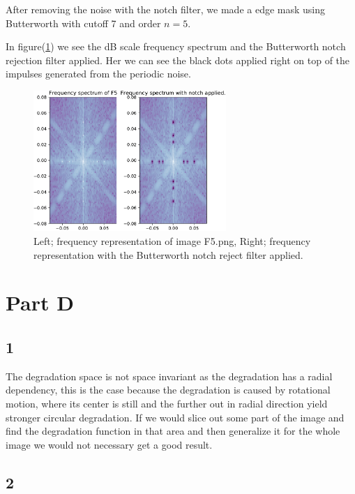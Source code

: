 {After removing the noise with the notch filter, we made a edge mask using Butterworth with cutoff 7 and order $n = 5$.



In figure(\ref{F5notch}) we see the dB scale frequency spectrum and the Butterworth notch rejection filter applied. Her we can see the black dots applied right on top of the impulses generated from the periodic noise.

    \begin{figure}[!htb]
        {\centering
            \includegraphics[width=0.65\textwidth]{removed_per_noise_freq.pdf}
            \caption{Left; frequency representation of image F5.png, Right; frequency representation with the Butterworth notch reject filter applied.}
            \label{F5notch}
        \par}
        \end{figure}




\section{Part D}
\subsection{1}

The degradation space is not space invariant as the degradation has a radial dependency, this is the case because the degradation is caused by rotational motion, where its center is still and the further out in radial direction yield stronger circular degradation. If we would slice out some part of the image and find the degradation function in that area and then generalize it for the whole image we would not necessary get a good result.


\subsection{2}

}
